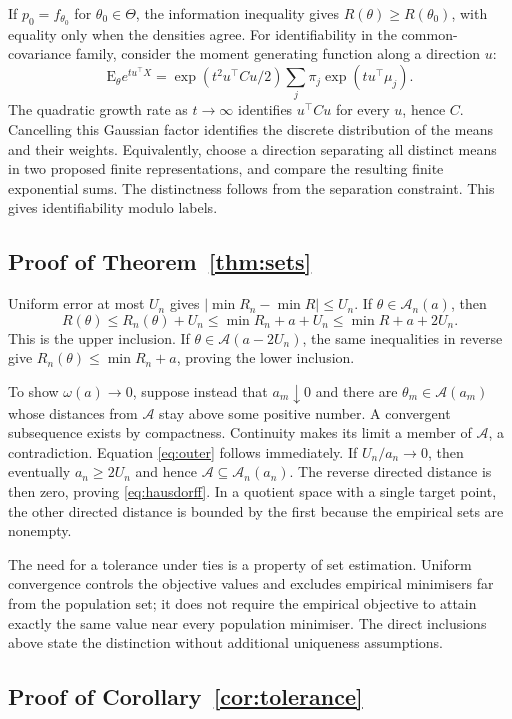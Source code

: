 \documentclass[12pt,a4paper]{article}
\theoremstyle{remark}
\newcommand{\E}{\mathrm E}
\begin{document}
If $p_0=f_{\theta_0}$ for $\theta_0\in\Theta$, the information inequality gives $R(\theta)\ge R(\theta_0)$, with equality only when the densities agree. For identifiability in the common-covariance family, consider the moment generating function along a direction $u$:
\[
 \E_\theta e^{t u^\top X}
 =\exp(t^2u^\top Cu/2)\sum_j\pi_j\exp(tu^\top\mu_j).
\]
The quadratic growth rate as $t\to\infty$ identifies $u^\top Cu$ for every $u$, hence $C$. Cancelling this Gaussian factor identifies the discrete distribution of the means and their weights. Equivalently, choose a direction separating all distinct means in two proposed finite representations, and compare the resulting finite exponential sums. The distinctness follows from the separation constraint. This gives identifiability modulo labels.

\subsection{Proof of Theorem~\ref{thm:sets}}

Uniform error at most $U_n$ gives
$|\min R_n-\min R|\le U_n$. If $\theta\in\mathcal A_n(a)$, then
\[
 R(\theta)\le R_n(\theta)+U_n
 \le\min R_n+a+U_n
 \le\min R+a+2U_n.
\]
This is the upper inclusion. If $\theta\in\mathcal A(a-2U_n)$, the same inequalities in reverse give
$R_n(\theta)\le\min R_n+a$, proving the lower inclusion.

To show $\omega(a)\to0$, suppose instead that $a_m\downarrow0$ and there are $\theta_m\in\mathcal A(a_m)$ whose distances from $\mathcal A$ stay above some positive number. A convergent subsequence exists by compactness. Continuity makes its limit a member of $\mathcal A$, a contradiction. Equation \eqref{eq:outer} follows immediately. If $U_n/a_n\to0$, then eventually $a_n\ge2U_n$ and hence $\mathcal A\subseteq\mathcal A_n(a_n)$. The reverse directed distance is then zero, proving \eqref{eq:hausdorff}. In a quotient space with a single target point, the other directed distance is bounded by the first because the empirical sets are nonempty.

The need for a tolerance under ties is a property of set estimation. Uniform convergence controls the objective values and excludes empirical minimisers far from the population set; it does not require the empirical objective to attain exactly the same value near every population minimiser. The direct inclusions above state the distinction without additional uniqueness assumptions.

\subsection{Proof of Corollary~\ref{cor:tolerance}}
\end{document}
